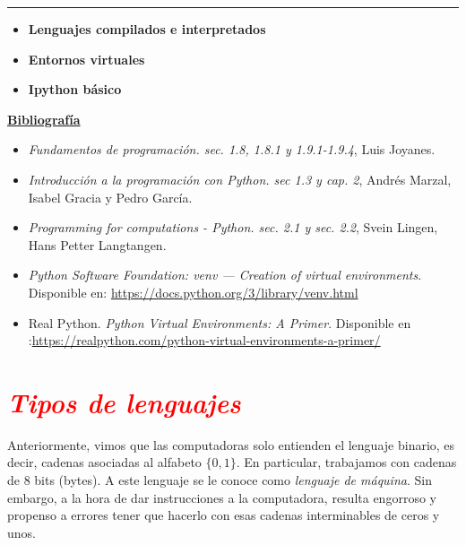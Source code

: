 \documentclass[12pt]{article}
\begin{document}
		\thispagestyle{firstpage}
		\vspace*{1.5cm}
	
	\begin{center}
		\rule{\textwidth}{0.4pt}
	\end{center}
	
	\begin{itemize}[leftmargin=*,label=\textcolor{red}{\ensuremath{\blacktriangleright}}]
		\item \textbf{Lenguajes compilados e interpretados}
		\item \textbf{Entornos virtuales}
		\item \textbf{Ipython básico}
	\end{itemize}
	
	\noindent
	\textbf{\underline{Bibliografía}}
	\begin{itemize}[leftmargin=*, label={\textcolor{blue}{$\bullet$}}]
		\item \textit{Fundamentos de programación. sec. 1.8, 1.8.1 y 1.9.1-1.9.4}, Luis Joyanes.
		\item \textit{Introducción a la programación con Python. sec 1.3 y cap. 2}, Andrés Marzal, Isabel Gracia y Pedro García.
		\item \textit{Programming for computations - Python. sec. 2.1 y sec. 2.2}, Svein Lingen, Hans Petter Langtangen.
		\item \textit{Python Software Foundation: venv — Creation of virtual environments}. 
		Disponible en: \url{https://docs.python.org/3/library/venv.html}
        \item Real Python. \textit{Python Virtual Environments: A Primer}. 
		Disponible en :\url{https://realpython.com/python-virtual-environments-a-primer/}
	\end{itemize}
     
    \section*{\textcolor{red}{\textit{Tipos de lenguajes}}}

    Anteriormente, vimos que las computadoras solo entienden el lenguaje binario, es decir, cadenas asociadas
    al alfabeto $\{0,1\}$. En particular, trabajamos con cadenas de 8 bits (bytes). A este lenguaje se le conoce 
    como \textit{lenguaje de máquina}. Sin embargo, a la hora de dar instrucciones a la computadora, resulta
    engorroso y propenso a errores tener que hacerlo con esas cadenas interminables de ceros y unos. 
\end{document}
